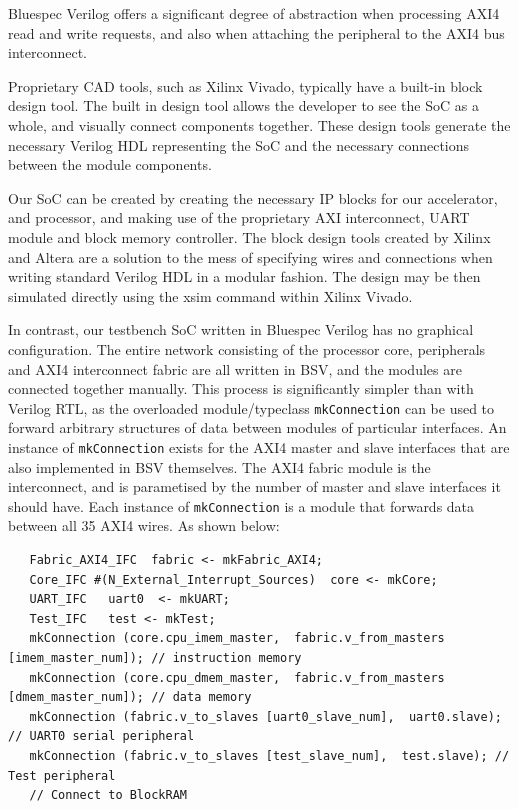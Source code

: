 \documentclass[a4paper,8pt]{report}
\begin{document}
Bluespec Verilog offers a significant degree of abstraction when processing AXI4
read and write requests, and also when attaching the peripheral to the AXI4 bus interconnect.

Proprietary CAD tools, such as Xilinx Vivado, typically have a built-in block
design tool. The built in design tool allows the developer to see the SoC as a
whole, and visually connect components together. These design tools generate the
necessary Verilog HDL representing the SoC and the necessary connections between
the module components.

Our SoC can be created by creating the necessary IP blocks for our accelerator,
and processor, and making use of the proprietary AXI interconnect, UART module
and block memory controller. The block design tools created by Xilinx and Altera
are a solution to the mess of specifying wires and connections when writing
standard Verilog HDL in a modular fashion. The design may be then simulated
directly using the xsim command within Xilinx Vivado.

In contrast, our testbench SoC written in Bluespec Verilog has no graphical
configuration. The entire network consisting of the processor core, peripherals
and AXI4 interconnect fabric are all written in BSV, and the modules are
connected together manually. This process is significantly simpler than with
Verilog RTL, as the overloaded module/typeclass \texttt{mkConnection} can be used to
forward arbitrary structures of data between modules of particular interfaces.
An instance of \texttt{mkConnection} exists for the AXI4 master and slave
interfaces that are also implemented in BSV themselves. The AXI4 fabric module
is the interconnect, and is parametised by the number of master and slave
interfaces it should have. Each instance of \texttt{mkConnection} is a module
that forwards data between all 35 AXI4 wires. As shown below:
\scriptsize
\begin{verbatim}
   Fabric_AXI4_IFC  fabric <- mkFabric_AXI4;
   Core_IFC #(N_External_Interrupt_Sources)  core <- mkCore;
   UART_IFC   uart0  <- mkUART;
   Test_IFC   test <- mkTest;
   mkConnection (core.cpu_imem_master,  fabric.v_from_masters [imem_master_num]); // instruction memory
   mkConnection (core.cpu_dmem_master,  fabric.v_from_masters [dmem_master_num]); // data memory
   mkConnection (fabric.v_to_slaves [uart0_slave_num],  uart0.slave); // UART0 serial peripheral
   mkConnection (fabric.v_to_slaves [test_slave_num],  test.slave); // Test peripheral
   // Connect to BlockRAM
\end{verbatim}
\normalsize
\end{document}
